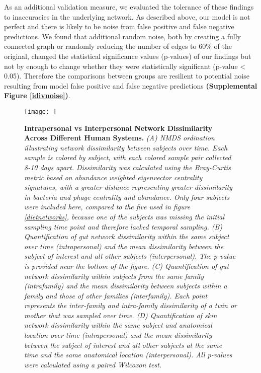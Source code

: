 \documentclass[12pt,]{article}
\begin{document}
As an additional validation measure, we evaluated the tolerance of these
findings to inaccuracies in the underlying network. As described above,
our model is not perfect and there is likely to be noise from false
positive and false negative predictions. We found that additional random
noise, both by creating a fully connected graph or randomly reducing the
number of edges to 60\% of the original, changed the statistical
significance values (p-values) of our findings but not by enough to
change whether they were statistically significant (p-value \textless{}
0.05). Therefore the comparisons between groups are resilient to
potential noise resulting from model false positive and false negative
predictions \textbf{(Supplemental Figure \ref{idivnoise})}.

\begin{figure}[htbp]
\centering
\texttt{[image: ]}
\caption{\textbf{Intrapersonal vs Interpersonal Network Dissimilarity
Across Different Human Systems.} \emph{(A) NMDS ordination illustrating
network dissimilarity between subjects over time. Each sample is colored
by subject, with each colored sample pair collected 8-10 days apart.
Dissimilarity was calculated using the Bray-Curtis metric based on
abundance weighted eigenvector centrality signatures, with a greater
distance representing greater dissimilarity in bacteria and phage
centrality and abundance. Only four subjects were included here,
compared to the five used in figure \ref{dietnetworks}, because one of
the subjects was missing the initial sampling time point and therefore
lacked temporal sampling. (B) Quantification of gut network
dissimilarity within the same subject over time (intrapersonal) and the
mean dissimilarity between the subject of interest and all other
subjects (interpersonal). The p-value is provided near the bottom of the
figure. (C) Quantification of gut network dissimilarity within subjects
from the same family (intrafamily) and the mean dissimilarity between
subjects within a family and those of other families (interfamily). Each
point represents the inter-family and intra-family dissimilarity of a
twin or mother that was sampled over time. (D) Quantification of skin
network dissimilarity within the same subject and anatomical location
over time (intrapersonal) and the mean dissimilarity between the subject
of interest and all other subjects at the same time and the same
anatomical location (interpersonal). All p-values were calculated using
a paired Wilcoxon test.}\label{intradiv}}
\end{figure}
\end{document}
